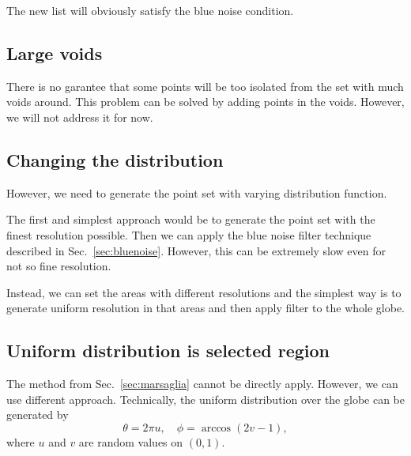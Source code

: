 The new list will obviously satisfy the blue noise condition.

\subsection{Large voids}

There is no garantee that some points will be too isolated from the
set with much voids around. This problem can be solved by adding
points in the voids. However, we will not address it for now.

\subsection{Changing the distribution}

However, we need to generate the point set with varying distribution
function.

The first and simplest approach would be to generate the point set
with the finest resolution possible. Then we can apply the blue noise
filter technique described in Sec.~\ref{sec:bluenoise}. However, this
can be extremely slow even for not so fine resolution.

Instead, we can set the areas with different resolutions and the
simplest way is to generate uniform resolution in that areas and then
apply filter to the whole globe.

\subsection{Uniform distribution is selected region}

The method from Sec.~\ref{sec:marsaglia} cannot be directly
apply. However, we can use different approach. Technically, the
uniform distribution over the globe can be generated by
%
\begin{equation}
  \theta = 2\pi u, \quad \phi=\arccos( 2v-1 ),
\end{equation}
%
where $u$ and $v$ are random values on $(0,1)$.
